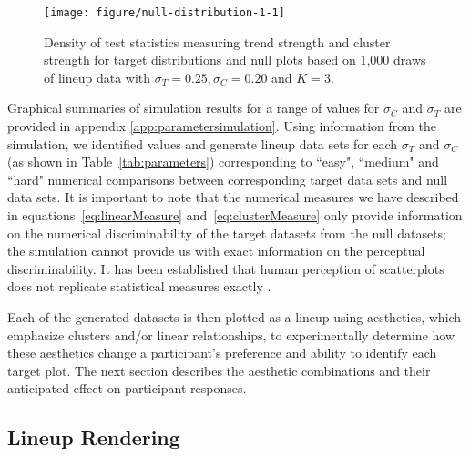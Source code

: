\documentclass[12pt]{article}\usepackage[]{graphicx}\usepackage[]{color}
\makeatletter
\def\maxwidth{ %
  \ifdim\Gin@nat@width>\linewidth
    \linewidth
  \else
    \Gin@nat@width
  \fi
}
\newenvironment{knitrout}{}{} %
\newcommand{\newdo}[1]{\todo[inline, color=Lime]{#1}} %
\makeatother
\begin{document}
\begin{figure}[ht]
\centering
\begin{knitrout}
\color{fgcolor}

{\centering \texttt{[image: figure/null-distribution-1-1]} 

}



\end{knitrout}
\caption[Simulation-based test statistic density for null and target plots]{\label{fig:targetsignal-0}Density of test statistics measuring trend strength and cluster strength for target distributions and null plots based on 1,000 draws of lineup data with $\sigma_T= 0.25, \sigma_C=0.20$ and $K=3$. }
\end{figure}

Graphical summaries of simulation results for a range of values for $\sigma_C$ and $\sigma_T$ are provided in appendix \ref{app:parametersimulation}. Using information from the simulation, we identified values and generate lineup data sets for each  $\sigma_T$ and $\sigma_C$ (as shown in Table~\ref{tab:parameters}) corresponding to ``easy", ``medium" and ``hard" numerical comparisons between corresponding target data sets and null data sets. It is important to note that the numerical measures we have described in equations~\eqref{eq:linearMeasure} and~\eqref{eq:clusterMeasure} only provide information on the numerical discriminability of the target datasets from the null datasets; the simulation cannot provide us with exact information on the perceptual discriminability. It has been established that human perception of scatterplots does not replicate statistical measures exactly \citep{bobko1979perception, mosteller1981eye, lewandowsky1989perception}.


Each of the generated datasets is then plotted as a lineup using aesthetics, which emphasize clusters and/or linear relationships, to experimentally determine how these aesthetics change a participant's preference and ability to identify each target plot. The next section describes the aesthetic combinations and their anticipated effect on participant responses. 

\subsection{Lineup Rendering}
\end{document}
